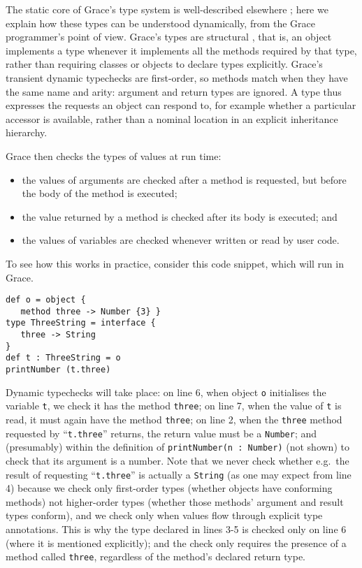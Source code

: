 \documentclass[sigplan,10pt,review,screen]{acmart}\settopmatter{printfolios=true}
\newcommand{\code}[1]{\texttt{#1}}
\begin{document}
The static core of Grace's type system is well-described
elsewhere \citep{TimJonesThesis};
here we explain how
these types can be understood 
dynamically, from the Grace programmer's point of view.
Grace's types are structural \citep{graceOnward12},
that is, an object implements a type whenever it
implements all the methods required by that type,
rather than requiring classes or objects to declare types explicitly.
Grace's transient dynamic typechecks are first-order, so methods match when they have
the same name and arity: 
argument and return types are ignored.
A type thus expresses the requests an object can respond to,
for example whether a particular accessor is available,
rather than a nominal location in an explicit inheritance hierarchy.

Grace then checks the types of values at run time:
%
\begin{itemize}
\item the values of arguments are checked after a method is requested, 
      but before the body of the method is executed;
\item the value returned by a method is checked after its body is executed; and
\item the values of variables are checked
      whenever written or read by user code.
\end{itemize}

To see how this works in practice, consider this code snippet, which
will run in Grace.

\begin{lstlisting}
def o = object {
   method three -> Number {3} }
type ThreeString = interface {
   three -> String
}
def t : ThreeString = o
printNumber (t.three)
\end{lstlisting}

Dynamic typechecks will take place: on line 6, when object \code{o}
initialises the variable \code{t}, we check it has the method
\code{three}; on line 7, when the value of \code{t} is read, it must
again have the method \code{three}; on line 2, when the \code{three}
method requested by ``\code{t.three}'' returns, the return value must
be a \code{Number}; and (presumably) within the definition of 
%
\code{printNumber(n :   Number)} 
%
(not shown) to check that its argument is a number. Note that we never check
whether e.g.\ the result of requesting ``\code{t.three}'' is actually
a \code{String} (as one may expect from line 4) because we check
only first-order types (whether objects have conforming methods) not higher-order
types (whether those methods' argument and result types conform), and
we check only when values flow through explicit type annotations.
This is why the type declared in lines 3-5 is checked only on line 6
(where it is mentioned explicitly); and the check only requires the
presence of a method called \code{three}, regardless of the method's
declared return type.
\end{document}

